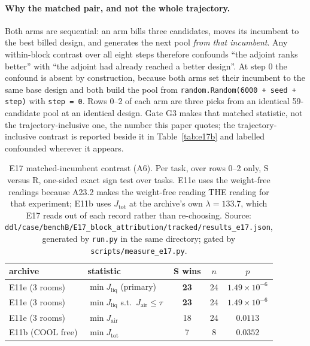 \documentclass{article}
\newcommand{\Jliq}{J_{\mathrm{liq}}}
\newcommand{\Jair}{J_{\mathrm{air}}}
\newcommand{\Jtot}{J_{\mathrm{tot}}}
\begin{document}
\paragraph{Why the matched pair, and not the whole trajectory.}
Both arms are sequential: an arm bills three candidates, moves its incumbent to the
best billed design, and generates the next pool \emph{from that incumbent}.  Any
within-block contrast over all eight steps therefore confounds ``the adjoint ranks
better'' with ``the adjoint had already reached a better design''.  At step 0 the
confound is absent by construction, because both arms set their incumbent to the
same base design and both build the pool from \texttt{random.Random(6000 + seed +
step)} with \texttt{step = 0}.  Rows 0--2 of each arm are three picks from an
identical 59-candidate pool at an identical design.  Gate G3 makes that matched
statistic, not the trajectory-inclusive one, the number this paper quotes; the
trajectory-inclusive contrast is reported beside it in Table~\ref{tab:e17b} and labelled
confounded wherever it appears.

\begin{table}[h]
\centering
\caption{E17 matched-incumbent contrast (A6).  Per task, over rows 0--2 only, S
versus R, one-sided exact sign test over tasks.  E11e uses the weight-free
readings because A23.2 makes the weight-free reading THE reading for that
experiment; E11b uses $\Jtot$ at the archive's own $\lambda = 133.7$, which E17
reads out of each record rather than re-choosing.  Source:
\texttt{ddl/case/benchB/E17\_block\_attribution/tracked/results\_e17.json},
generated by \texttt{run.py} in the same directory; gated by
\texttt{scripts/measure\_e17.py}.}
\label{tab:e17a}
\begin{tabular}{llccc}
\toprule
archive & statistic & S wins & $n$ & $p$ \\
\midrule
E11e (3 rooms) & $\min\Jliq$ (primary) & \textbf{23} & 24 & $1.49\times10^{-6}$ \\
E11e (3 rooms) & $\min\Jliq$ s.t.\ $\Jair\le\tau$ & \textbf{23} & 24 & $1.49\times10^{-6}$ \\
E11e (3 rooms) & $\min\Jair$ & 18 & 24 & $0.0113$ \\
E11b (COOL free) & $\min\Jtot$ & 7 & 8 & $0.0352$ \\
\bottomrule
\end{tabular}
\end{table}
\end{document}
